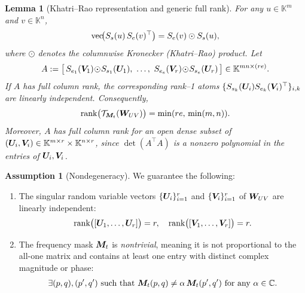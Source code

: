 \documentclass{article}
\theoremstyle{plain}
\newtheorem{lemma}[theorem]{Lemma}
\theoremstyle{definition}
\newtheorem{assumption}[theorem]{Assumption}
\theoremstyle{remark}
\begin{document}
\begin{lemma}[Khatri--Rao representation and generic full rank]
\label{lem:khatri-rao}
For any $u\in\mathbb{K}^m$ and $v\in\mathbb{K}^n$,
\begin{align}
  \mathrm{vec}\!\big(S_s(u)\,S_e(v)^\top\big)
  = S_e(v) \odot S_s(u), \notag
\end{align}
where $\odot$ denotes the columnwise Kronecker (Khatri--Rao) product.
Let
\begin{align}
A
  := \big[\,S_{e_1}({\bm{V}}_1)\!\odot\!S_{s_1}({\bm{U}}_1),~
   \dots,~
   S_{e_e}({\bm{V}}_r)\!\odot\!S_{s_e}({\bm{U}}_r)\,\big]
   \in\mathbb{K}^{mn\times (r e)}. \notag
\end{align}
If $A$ has full column rank, the corresponding rank--1 atoms 
$\{S_{s_k}({\bm{U}}_i)S_{e_k}({\bm{V}}_i)^\top\}_{i,k}$ are linearly independent. Consequently,
\begin{align}
  \operatorname{rank}\!\big(\mathcal{T}_{{\bm{M}}_t}({\bm{W}}_{UV})\big)
  = \min(re,\,\min(m,n)). \notag
\end{align}
Moreover, $A$ has full column rank for an open dense subset of $({\bm{U}}_i,{\bm{V}}_i)\in\mathbb{K}^{m\times r}\times\mathbb{K}^{n\times r}$, since $\det(A^\top A)$ is a nonzero polynomial in the entries of ${\bm{U}}_i,{\bm{V}}_i$.
\end{lemma}

\begin{assumption}[Nondegeneracy]
\label{assump:nondegeneracy}
We guarantee the following:
\begin{enumerate}
    \item The singular random variable vectors $\{{\bm{U}}_i\}_{i=1}^r$ and $\{{\bm{V}}_i\}_{i=1}^r$ of ${\bm{W}}_{UV}$ are linearly independent:
    \begin{align}
        \mathrm{rank}\big([{\bm{U}}_1,\dots,{\bm{U}}_r]\big) = r, \quad 
        \mathrm{rank}\big([{\bm{V}}_1,\dots,{\bm{V}}_r]\big) = r. \notag
    \end{align}
    \item The frequency mask ${\bm{M}}_t$ is \emph{nontrivial}, meaning it is not proportional to the all-one matrix and contains at least one entry with distinct complex magnitude or phase:
    \begin{align}
        \exists (p,q),(p',q') \text{ such that } 
        {\bm{M}}_t(p,q) \neq \alpha\, {\bm{M}}_t(p',q') \text{ for any } \alpha \in \mathbb{C}. \notag
    \end{align}
\end{enumerate}
\end{assumption}
\end{document}
